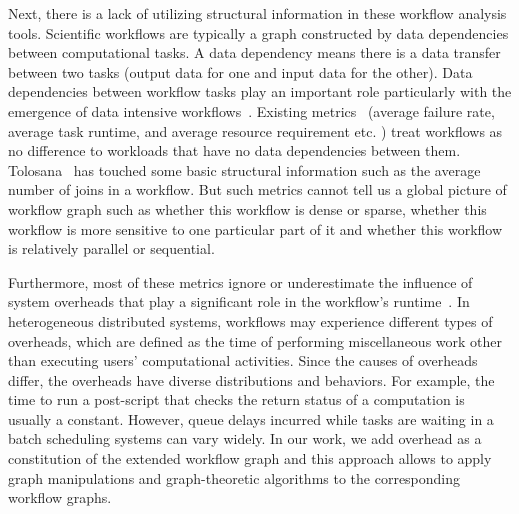 Next, there is a lack of utilizing structural information in these workflow analysis tools. Scientific workflows are typically a graph constructed by data dependencies between computational tasks.  A data dependency means there is a data transfer between two tasks (output data for one and input data for the other). Data dependencies between workﬂow tasks play an important role particularly with the emergence of data intensive workflows~\cite{Callaghan2011}. Existing metrics~\cite{Juve2013, Callaghan2011, Bharathi2008}  (average failure rate, average task runtime, and average resource requirement etc. ) treat workflows as no difference to workloads that have no data dependencies between them. Tolosana~\cite{Tolosana2011} has touched some basic structural information such as the average number of joins in a workflow. But such metrics cannot tell us a global picture of workflow graph such as whether this workflow is dense or sparse, whether this workflow is more sensitive to one particular part of it and whether this workflow is relatively parallel or sequential. 

Furthermore, most of these metrics ignore or underestimate the influence of system overheads that play a significant role in the workflow's runtime~\cite{Chen2011, Prodan2008, Ostberg2011}. In heterogeneous distributed systems, workflows may experience different types of overheads, which are defined as the time of performing miscellaneous work other than executing users’ computational activities. Since the causes of overheads differ, the overheads have diverse distributions and behaviors. For example, the time to run a post-script that checks the return status of a computation is usually a constant. However, queue delays incurred while tasks are waiting in a batch scheduling systems can vary widely. In our work, we add overhead as a constitution of the extended workflow graph and this approach allows to apply graph manipulations and graph-theoretic algorithms to the corresponding workflow graphs. 

